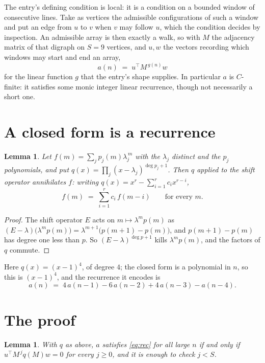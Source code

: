 \documentclass[11pt,a4paper]{article}
\theoremstyle{plain}
\newtheorem{lemma}[theorem]{Lemma}
\theoremstyle{definition}
\begin{document}
The entry's defining condition is local: it is a condition on a bounded window of consecutive lines. Take as vertices the
admissible configurations of such a window and put an edge from $u$ to $v$ when $v$ may
follow $u$, which the condition decides by inspection. An admissible array is then exactly a
walk, so with $M$ the adjacency matrix of that digraph on $S=9$ vertices, and $u,w$ the
vectors recording which windows may start and end an array,
\[
a(n)\;=\;u^{\!\top}M^{\,g(n)}w
\]
for the linear function $g$ that the entry's shape supplies. In particular $a$ is
$C$-finite: it satisfies some monic integer linear recurrence, though not necessarily a short
one.

\section{A closed form is a recurrence}

\begin{lemma}\label{lem:ann}
Let $f(m)=\sum_{j}p_j(m)\lambda_j^{\,m}$ with the $\lambda_j$ distinct and the $p_j$
polynomials, and put $q(x)=\prod_j(x-\lambda_j)^{\deg p_j+1}$. Then $q$ applied to the shift
operator annihilates $f$: writing $q(x)=x^{r}-\sum_{i=1}^{r}c_ix^{r-i}$,
\[
f(m)\;=\;\sum_{i=1}^{r}c_i\,f(m-i)\qquad\text{for every }m.
\]
\end{lemma}

\begin{proof}
The shift operator $E$ acts on $m\mapsto\lambda^{m}p(m)$ as
$(E-\lambda)\bigl(\lambda^{m}p(m)\bigr)=\lambda^{m+1}\bigl(p(m+1)-p(m)\bigr)$, and
$p(m+1)-p(m)$ has degree one less than $p$. So $(E-\lambda)^{\deg p+1}$ kills
$\lambda^{m}p(m)$, and the factors of $q$ commute.
\end{proof}

Here $q(x)=(x-1)^{4}$, of degree $4$; the closed form is a polynomial in $n$, so this is $(x-1)^{4}$, and the recurrence it encodes is
\begin{equation}\label{eq:rec}
a(n)\;=\;4\,a(n-1) - 6\,a(n-2) + 4\,a(n-3) - a(n-4).
\end{equation}

\section{The proof}

\begin{lemma}\label{lem:crit}
With $q$ as above, $a$ satisfies \eqref{eq:rec} for all large $n$ if and only if
$u^{\!\top}M^{\,j}q(M)w=0$ for every $j\ge0$, and it is enough to check $j<S$.
\end{lemma}
\end{document}

